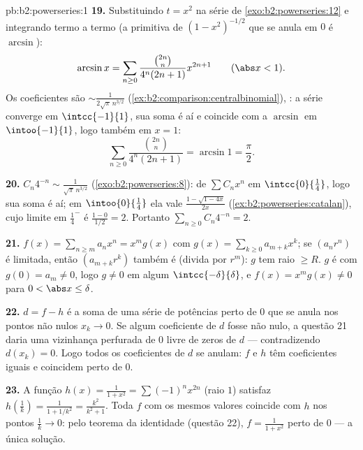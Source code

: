 \begin{solution}{pb:b2:powerseries:1}
\textbf{19.} Substituindo $t = x^2$ na série de
\cref{exo:b2:powerseries:12} e integrando termo a
termo (a primitiva de $(1-x^2)^{-1/2}$ que se anula em $0$ é
$\arcsin$):
\[
\arcsin x = \sum_{n\geq0}
\frac{\binom{2n}n}{4^n(2n+1)}x^{2n+1}
\qquad(\abs x < 1) .
\]
Os coeficientes são $\sim \frac{1}{2\sqrt\pi\,n^{3/2}}$
(\cref{ex:b2:comparison:centralbinomial}), : a série
converge \emph{} em $\intcc{-1}{1}$, sua soma é
 aí e coincide com a  $\arcsin$
em $\intoo{-1}{1}$, logo também em $x = 1$:
\[
\sum_{n\geq0}\frac{\binom{2n}n}{4^n(2n+1)}
= \arcsin 1 = \frac\pi2 .
\]

\textbf{20.} $C_n4^{-n} \sim \frac{1}{\sqrt\pi\,n^{3/2}}$
(\cref{exo:b2:powerseries:8}):  de $\sum
C_nx^n$ em $\intcc{0}{\frac14}$, logo sua soma é 
aí; em $\intoo{0}{\frac14}$ ela vale
$\frac{1-\sqrt{1-4x}}{2x}$
(\cref{ex:b2:powerseries:catalan}), cujo limite em
$\frac14^-$ é $\frac{1-0}{1/2} = 2$. Portanto $\sum_{n\geq0}
C_n4^{-n} = 2$.

\textbf{21.} $f(x) = \sum_{n\geq m}a_nx^n = x^m g(x)$ com
$g(x) = \sum_{k\geq0}a_{m+k}x^k$; se $(a_nr^n)$ é limitada, então
$(a_{m+k}r^k)$ também é (divida por $r^m$): $g$ tem raio $\geq
R$. $g$ é  com $g(0) = a_m \neq 0$, logo $g \neq 0$
em algum $\intcc{-\delta}{\delta}$, e $f(x) = x^mg(x) \neq 0$
para $0 < \abs x \leq \delta$.

\textbf{22.} $d = f - h$ é a soma de uma série de potências perto de $0$
que se anula nos pontos não nulos $x_k \to 0$. Se algum
coeficiente de $d$ fosse não nulo, a questão 21 daria uma
vizinhança perfurada de $0$ livre de zeros de $d$ ---
contradizendo $d(x_k) = 0$. Logo todos os coeficientes de $d$ se anulam:
$f$ e $h$ têm coeficientes iguais e coincidem perto de $0$.

\textbf{23.} A função $h(x) = \frac{1}{1+x^2} =
\sum(-1)^nx^{2n}$ (raio $1$) satisfaz $h(\frac1k) =
\frac{1}{1 + 1/k^2} = \frac{k^2}{k^2+1}$. Toda $f$  com
os mesmos valores coincide com $h$ nos pontos $\frac1k \to 0$:
pelo teorema da identidade (questão 22), $f = \frac{1}{1+x^2}$
perto de $0$ --- a única solução.


\end{solution}
